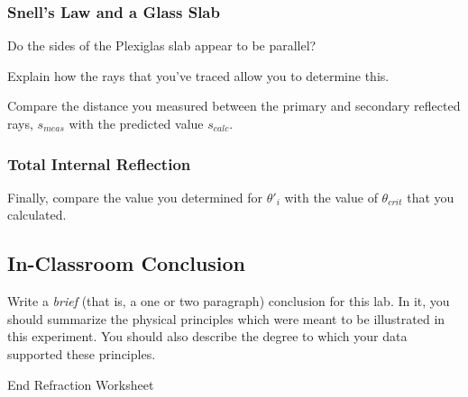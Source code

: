 \subsubsection{Snell's Law and a Glass Slab}
\noindent
Do the sides of the Plexiglas slab appear to be parallel?
\vspace*{.3cm}

\noindent
Explain how the rays that you've traced allow you to determine this.
\vspace*{1.8cm}


\noindent 
Compare the distance you measured between the primary and secondary
reflected rays, $s_{meas}$ with the predicted value $s_{calc}.$
\vspace*{2.4cm}


\subsubsection{Total Internal Reflection}

Finally, compare the value you determined for $\theta '_i$ with the
value of $\theta _{crit}$ that you calculated.
\vspace*{1.4cm}

\clearpage
\subsection{In-Classroom Conclusion}

Write a {\it brief} (that is, a one or two paragraph) conclusion for
this lab. In it, you should summarize the physical
principles which were meant to be illustrated in this experiment. You
should also describe the degree to which your data supported these
principles.



\vfill
{\Large End Refraction Worksheet} 

\newpage

\renewcommand{\thesection}{\thechapter.\arabic{section}}
